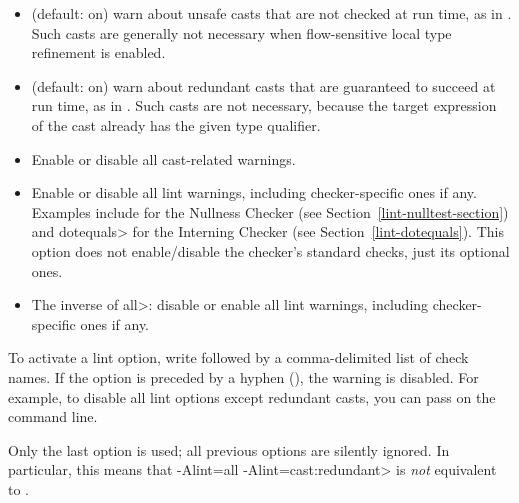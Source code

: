 \begin{itemize}

\item
   (default: on) warn about unsafe casts that are not
  checked at run time, as in .  Such casts
  are generally not necessary when flow-sensitive local type refinement is
  enabled.

\item
   (default: on) warn about redundant
  casts that are guaranteed to succeed at run time,
  as in .  Such casts are not necessary,
  because the target expression of the cast already has the given type
  qualifier.

\item
   Enable or disable all cast-related warnings.

\item
\begin{sloppypar}
   Enable or disable all lint warnings, including
  checker-specific ones if any.  Examples include  for the
  Nullness Checker (see Section~\ref{lint-nulltest-section}) and \<dotequals> for
  the Interning Checker (see Section~\ref{lint-dotequals}).  This option
  does not enable/disable the checker's standard checks, just its optional
  ones.
\end{sloppypar}

\item
   The inverse of \<all>:  disable or enable all lint warnings,
  including checker-specific ones if any.

\end{itemize}


\noindent
To activate a lint option, write  followed by a
comma-delimited list of check names.  If the option is preceded by a
hyphen (\code{-}), the warning is disabled.  For example, to disable all
lint options except redundant casts, you can pass
 on the command line.

Only the last  option is used; all previous 
options are silently ignored.  In particular, this means that \<-Alint=all
-Alint=cast:redundant> is \emph{not} equivalent to
.


